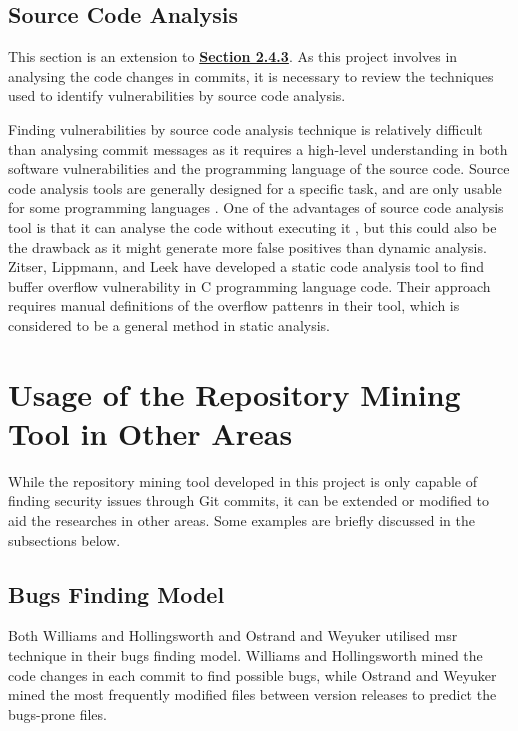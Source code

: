 \documentclass[12pt, a4paper]{report}
\begin{document}
\subsection{Source Code Analysis}
This section is an extension to \hyperref[subsec:finding_vuln]{\textbf{Section 2.4.3}}. As this
project involves in analysing the code changes in commits, it is necessary to review the techniques
used to identify vulnerabilities by source code analysis.

Finding vulnerabilities by source code analysis technique is relatively difficult than analysing
commit messages as it requires a high-level understanding in both software vulnerabilities and the
programming language of the source code. Source code analysis tools are generally designed for a
specific task, and are only usable for some programming languages \cite{antunes_2009}. One of the
advantages of source code analysis tool is that it can analyse the code without executing it
\cite{livshits_finding_2005}, but this could also be the drawback as it might generate more false
positives than dynamic analysis. Zitser, Lippmann, and Leek \cite{zitser_2004} have developed a
static code analysis tool to find buffer overflow vulnerability in C programming language code.
Their approach requires manual definitions of the overflow pattenrs in their tool, which is
considered to be a general method in static analysis.

\section{Usage of the Repository Mining Tool in Other Areas}
While the repository mining tool developed in this project is only capable of finding security
issues through Git commits, it can be extended or modified to aid the researches in other areas.
Some examples are briefly discussed in the subsections below.

\subsection{Bugs Finding Model}
Both Williams and Hollingsworth \cite{williams_2005} and Ostrand and Weyuker \cite{ostrand_2004}
utilised \acrshort{msr} technique in their bugs finding model. Williams and Hollingsworth mined the
code changes in each commit to find possible bugs, while Ostrand and Weyuker mined the most
frequently modified files between version releases to predict the bugs-prone files.
\end{document}
